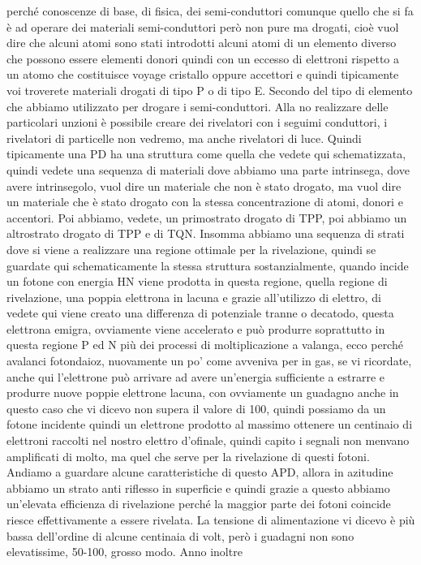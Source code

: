 {perché conoscenze di base, di fisica, dei semi-conduttori comunque quello che si fa è ad operare dei materiali semi-conduttori però non pure ma drogati, cioè vuol dire che alcuni atomi sono stati introdotti alcuni atomi di un elemento diverso che possono essere elementi donori quindi con un eccesso di elettroni rispetto a un atomo che costituisce voyage cristallo oppure accettori e quindi tipicamente voi troverete materiali drogati di tipo P o di tipo E. Secondo del tipo di elemento che abbiamo utilizzato per drogare i semi-conduttori. Alla no realizzare delle particolari unzioni è possibile creare dei rivelatori con i seguimi conduttori, i rivelatori di particelle non vedremo, ma anche rivelatori di luce. Quindi tipicamente una PD ha una struttura come quella che vedete qui schematizzata, quindi vedete una sequenza di materiali dove abbiamo una parte intrinsega, dove avere intrinsegolo, vuol dire un materiale che non è stato drogato, ma vuol dire un materiale che è stato drogato con la stessa concentrazione di atomi, donori e accentori. Poi abbiamo, vedete, un primostrato drogato di TPP, poi abbiamo un altrostrato drogato di TPP e di TQN. Insomma abbiamo una sequenza di strati dove si viene a realizzare una regione ottimale per la rivelazione, quindi se guardate qui schematicamente la stessa struttura sostanzialmente, quando incide un fotone con energia HN viene prodotta in questa regione, quella regione di rivelazione, una poppia elettrona in lacuna e grazie all'utilizzo di elettro, di vedete qui viene creato una differenza di potenziale tranne o decatodo, questa elettrona emigra, ovviamente viene accelerato e può produrre soprattutto in questa regione P ed N più dei processi di moltiplicazione a valanga, ecco perché avalanci fotondaioz, nuovamente un po' come avveniva per in gas, se vi ricordate, anche qui l'elettrone può arrivare ad avere un'energia sufficiente a estrarre e produrre nuove poppie elettrone lacuna, con ovviamente un guadagno anche in questo caso che vi dicevo non supera il valore di 100, quindi possiamo da un fotone incidente quindi un elettrone prodotto al massimo ottenere un centinaio di elettroni raccolti nel nostro elettro d'ofinale, quindi capito i segnali non menvano amplificati di molto, ma quel che serve per la rivelazione di questi fotoni. Andiamo a guardare alcune caratteristiche di questo APD, allora in azitudine abbiamo un strato anti riflesso in superficie e quindi grazie a questo abbiamo un'elevata efficienza di rivelazione perché la maggior parte dei fotoni coincide riesce effettivamente a essere rivelata. La tensione di alimentazione vi dicevo è più bassa dell'ordine di alcune centinaia di volt, però i guadagni non sono elevatissime, 50-100, grosso modo. Anno inoltre 

}
